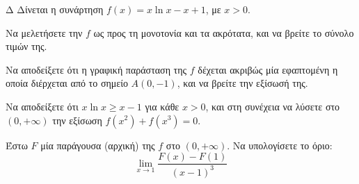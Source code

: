 \begin{thema}{Δ}
Δίνεται η συνάρτηση $f(x) = x\ln x - x + 1$, με $x > 0$.
\begin{erwthma}
    \item Να μελετήσετε την $f$ ως προς τη μονοτονία και τα ακρότατα, και να βρείτε το σύνολο τιμών της.
    \item Να αποδείξετε ότι η γραφική παράσταση της $f$ δέχεται ακριβώς μία εφαπτομένη η οποία διέρχεται από το σημείο $A(0, -1)$, και να βρείτε την εξίσωσή της.
    \item Να αποδείξετε ότι $x\ln x \ge x - 1$ για κάθε $x > 0$, και στη συνέχεια να λύσετε στο $(0, +\infty)$ την εξίσωση $f(x^2) + f(x^3) = 0$.
    \item Έστω $F$ μία παράγουσα (αρχική) της $f$ στο $(0, +\infty)$. Να υπολογίσετε το όριο:
    \[ \lim_{x\to 1} \frac{F(x) - F(1)}{(x-1)^3} \]
\end{erwthma}
\end{thema}
